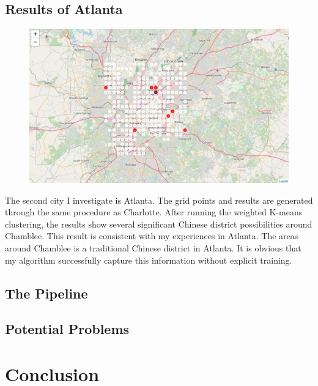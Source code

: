 \documentclass{article}
\begin{document}
\subsection{Results of Atlanta}

\begin{figure}[h!]
\includegraphics[width=1.0\textwidth]{cn5.jpg}
\centering
\end{figure}

The second city I investigate is Atlanta.
The grid points and results are generated through the same procedure as Charlotte.
After running the weighted K-means clustering, the results show several significant Chinese district possibilities around Chamblee.
This result is consistent with my experiences in Atlanta.
The areas around Chamblee is a traditional Chinese district in Atlanta.
It is obvious that my algorithm successfully capture this information without explicit training.

\newpage

\subsection{The Pipeline}


\subsection{Potential Problems}


\section{Conclusion}

\newpage



\end{document}
